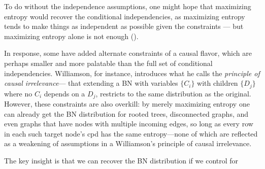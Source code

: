 \documentclass{article}
\theoremstyle{plain}
\theoremstyle{definition}
\theoremstyle{remark}
\numberwithin{equation}{section}
\begin{document}
	To do without the independence assumptions, one might hope
        that maximizing entropy would recover the conditional
        independencies, as maximizing entropy tends to make things as
        independent as possible given the constraints --- but
        maximizing entropy alone is not enough
        (). 
\begin{vfull}	
	In response, some \cite{williamson2001foundations}\cite{holmes2001independence} have added alternate constraints of a causal flavor, which are perhaps smaller and more palatable than the full set of conditional independencies.  Williamson, for instance, introduces what he calls the \emph{principle of causal irrelevance}--- that extending a BN with variables $\{C_i\}$ with children $\{D_j\}$ where no $C_i$ depends on a $D_j$, restricts to the same distribution as the original.  However, these constraints are also overkill: by merely maximizing entropy one can already get the BN distribution for rooted trees, disconnected graphs, and even graphs that have nodes with multiple incoming edges, so long as every row in each such target node's cpd has the same entropy---none of which are reflected as a weakening of assumptions in a Williamson's principle of causal irrelevance.
	

\end{vfull}
The key insight
	is that we can recover the BN distribution if we control for
\end{document}
